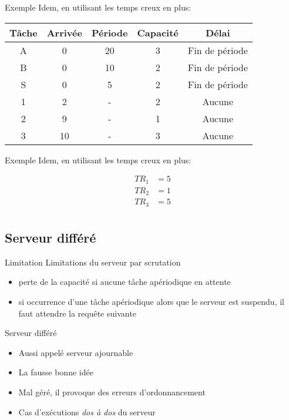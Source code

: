 \begin{frame}{Exemple}
  Idem, en utilisant les temps creux en plus:
  \begin{center}
    \begin{tabular}{ccccc}
      \hline
      Tâche & Arrivée & Période & Capacité & Délai \\
      \hline
      A &  0 & 20 & 3 & Fin de période\\
      B &  0 & 10 & 2 & Fin de période\\
      S &  0 &  5 & 2 & Fin de période\\
      1 &  2 &  - & 2 & Aucune\\
      2 &  9 &  - & 1 & Aucune\\
      3 & 10 &  - & 3 & Aucune\\
      \hline
    \end{tabular}
    \pause
    
  \end{center}
\end{frame}

\begin{frame}{Exemple}
  Idem, en utilisant les temps creux en plus:
  \begin{center}
    
    \begin{align*}
      TR_1 &= 5\\
      TR_2 &= 1\\
      TR_3 &= 5\\
    \end{align*}
  \end{center}
\end{frame}

\subsection{Serveur différé}

\begin{frame}{Limitation}
  Limitations du serveur par scrutation
  \begin{itemize}
  \item perte de la capacité si aucune tâche apériodique en attente
  \item si occurrence d'une tâche apériodique alors que le serveur est
    suspendu, il faut attendre la requête suivante
  \end{itemize}
\end{frame}

\begin{frame}{Serveur différé}
  \begin{itemize}
  \item Aussi appelé serveur ajournable
  \item La fausse bonne idée
  \item Mal géré, il provoque des erreurs d'ordonnancement
  \item Cas d'exécutions \emph{dos à dos} du serveur
  \end{itemize}
\end{frame}

